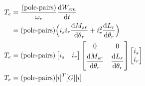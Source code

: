 \documentclass[a4paper,numbers=noenddot,12pt]{scrbook}
\begin{document}
        \begin{align}
            T_e & = \frac{(\text{pole-pairs})}{\omega_r} \frac{\dif W_{em}}{\dif t} \nonumber\\
            & =  (\text{pole-pairs})\Big(i_s i_r \frac{\dif M_{sr}}{\dif \theta_r}  + i_r^2 \frac{\dif L_r}{\dif \theta_r} \Big) \nonumber \\
            T_e & = (\text{pole-pairs})
            \begin{bmatrix}
                i_s & i_r
            \end{bmatrix}
            \begin{bmatrix}
                0 & 0 \\[1ex]
                \dfrac{\dif M_{sr}}{\dif \theta_r} & \dfrac{\dif L_{r}}{\dif \theta_r} 
            \end{bmatrix}
            \begin{bmatrix}
                i_s \\ i_r
            \end{bmatrix} \\
            T_e &= (\text{pole-pairs}) {[i]}^T[G][i] &
        \end{align}
\end{document}
